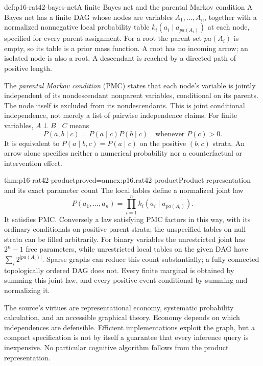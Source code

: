 \begin{hbdefinition}{def:p16-rat42-bayes-net}{A finite Bayes net and the parental Markov condition}
A Bayes net has a finite DAG whose nodes are variables
\(A_1,\ldots,A_n\), together with a normalized nonnegative local
probability table \(k_i(a_i\mid a_{pa(A_i)})\) at each node,
specified for every parent assignment. For a root the parent set
\(pa(A_i)\) is empty, so its table is a prior mass function.
A root has no incoming arrow; an isolated node is also a root.
A descendant is reached by a directed path of positive length.

The \emph{parental Markov condition} (PMC) states that each node's
variable is jointly independent of its nondescendant nonparent
variables, conditional on its parents. The node itself is excluded
from its nondescendants. This is joint conditional independence,
not merely a list of pairwise independence claims. For finite
variables, \(A\perp B\mid C\) means
\[
 P(a,b\mid c)=P(a\mid c)P(b\mid c)
 \quad\text{whenever }P(c)>0.
\]
It is equivalent to \(P(a\mid b,c)=P(a\mid c)\) on the
positive \((b,c)\) strata. An arrow alone specifies neither a
numerical probability nor a counterfactual or intervention effect.
\end{hbdefinition}

\begin{hbtheorem}{thm:p16-rat42-product}{proved=annex:p16.rat42-product}{Product representation and its exact parameter count}
The local tables define a normalized joint law
\[
 P(a_1,\ldots,a_n)=\prod_{i=1}^n k_i(a_i\mid a_{pa(A_i)}).
\]
It satisfies PMC. Conversely a law satisfying PMC factors in this
way, with its ordinary conditionals on positive parent strata;
the unspecified tables on null strata can be filled arbitrarily.
For binary variables the unrestricted joint has \(2^n-1\) free
parameters, while unrestricted local tables on the given DAG have
\(\sum_i2^{|pa(A_i)|}\). Sparse graphs can reduce this count
substantially; a fully connected topologically ordered DAG does not.
Every finite marginal is obtained by summing this joint law, and
every positive-event conditional by summing and normalizing it.
\end{hbtheorem}

The source's virtues are representational economy, systematic probability
calculation, and an accessible graphical theory. Economy depends on which
independences are defensible. Efficient implementations exploit the graph,
but a compact specification is not by itself a guarantee that every
inference query is inexpensive. No particular cognitive algorithm follows
from the product representation.

